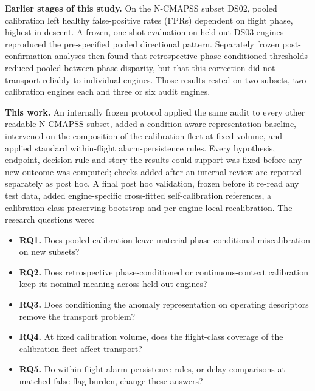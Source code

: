 \documentclass[preprint,11pt,a4paper]{elsarticle}
\begin{document}
\textbf{Earlier stages of this study.} On the N-CMAPSS subset DS02, pooled calibration left healthy false-positive rates (FPRs) dependent on flight phase, highest in descent. A frozen, one-shot evaluation on held-out DS03 engines reproduced the pre-specified pooled directional pattern. Separately frozen post-confirmation analyses then found that retrospective phase-conditioned thresholds reduced pooled between-phase disparity, but that this correction did not transport reliably to individual engines. Those results rested on two subsets, two calibration engines each and three or six audit engines.

\textbf{This work.} An internally frozen protocol applied the same audit to every other readable N-CMAPSS subset, added a condition-aware representation baseline, intervened on the composition of the calibration fleet at fixed volume, and applied standard within-flight alarm-persistence rules. Every hypothesis, endpoint, decision rule and story the results could support was fixed before any new outcome was computed; checks added after an internal review are reported separately as post hoc. A final post hoc validation, frozen before it re-read any test data, added engine-specific cross-fitted self-calibration references, a calibration-class-preserving bootstrap and per-engine local recalibration. The research questions were:
\begin{itemize}
\item \textbf{RQ1.} Does pooled calibration leave material phase-conditional miscalibration on new subsets?
\item \textbf{RQ2.} Does retrospective phase-conditioned or continuous-context calibration keep its nominal meaning across held-out engines?
\item \textbf{RQ3.} Does conditioning the anomaly representation on operating descriptors remove the transport problem?
\item \textbf{RQ4.} At fixed calibration volume, does the flight-class coverage of the calibration fleet affect transport?
\item \textbf{RQ5.} Do within-flight alarm-persistence rules, or delay comparisons at matched false-flag burden, change these answers?
\end{itemize}
\end{document}
